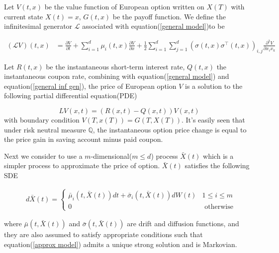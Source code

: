 Let $V(t,x)$ be the value function of European option written on $X(T)$ with current state $X(t)=x$, $G(t, x)$ be the payoff function. We define the infinitesimal generator $\mathcal{L}$ associated with equation(\ref{general model})to be

\begin{equation}\label{general inf gen}
    \begin{aligned}
        (\mathcal{L} V)(t, x)&=\frac{\partial V}{\partial t} + \sum_{i=1}^{d} \mu_i(t, x) \frac{\partial V}{\partial x}+\frac{1}{2} \sum_{i=1}^{d}\sum_{j=1}^{d} (\sigma(t,x) \sigma^{\intercal}(t,x))_{i,j} \frac{\partial^2 V}{\partial x_i x_k}
    \end{aligned}
\end{equation}

Let $R(t,x)$ be the instantaneous short-term interest rate, $Q(t,x)$ the instantaneous coupon rate, combining with equation(\ref{general model}) and equation(\ref{general inf gen}), the price of European option $V$ is a solution to the following partial differential equation(PDE)

\begin{equation}
    LV(x,t) = (R(x,t) - Q(x,t))V(x,t)
\end{equation}
\noindent with boundary condition $V(T,x(T)) = G(T,X(T))$. It's easily seen that under risk neutral measure $\mathbb Q$, the instantaneous option price change is equal to the price gain in saving account minus paid coupon. 

Next we consider to use a $m$-dimensional($m \leq d$) process $\bar{X}(t)$ which is a simpler process to approximate the price of option. $\bar{X}(t)$ satisfies the following SDE

\begin{equation}\label{approx model}
    \begin{aligned}
        &d\bar{X}(t)= \begin{cases}   \bar{\mu}_i(t, \bar{X}(t)) dt + \bar{\sigma}_i(t, \bar{X}(t)) dW(t) & 1 \leq i \leq m \\
        0 & \text { otherwise }\end{cases}
        \end{aligned}
\end{equation}

\noindent where $\bar{\mu}(t, \bar{X}(t))$ and $\bar{\sigma}(t, \bar{X}(t))$ are drift and diffusion functions, and they are also assumed to satisfy appropriate conditions such that equation(\ref{approx model}) admits a unique strong solution and is Markovian.

